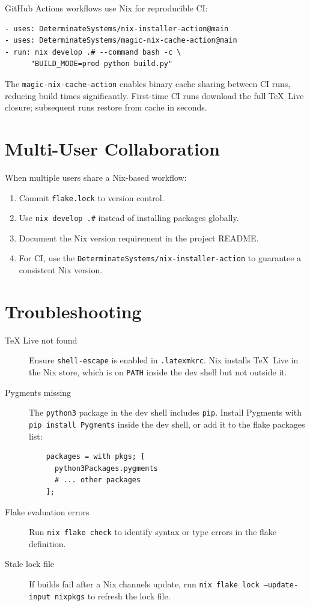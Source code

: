 GitHub Actions workflows use Nix for reproducible CI:

\begin{verbatim}
- uses: DeterminateSystems/nix-installer-action@main
- uses: DeterminateSystems/magic-nix-cache-action@main
- run: nix develop .# --command bash -c \
      "BUILD_MODE=prod python build.py"
\end{verbatim}

The \texttt{magic-nix-cache-action} enables binary cache sharing between CI
runs, reducing build times significantly.  First-time CI runs download
the full TeX~Live closure; subsequent runs restore from cache in seconds.

\section{Multi-User Collaboration}

When multiple users share a Nix-based workflow:

\begin{enumerate}
  \item Commit \texttt{flake.lock} to version control.
  \item Use \texttt{nix develop .#} instead of installing packages
        globally.
  \item Document the Nix version requirement in the project README.
  \item For CI, use the \texttt{DeterminateSystems/nix-installer-action}
        to guarantee a consistent Nix version.
\end{enumerate}

\section{Troubleshooting}

\begin{description}
  \item[TeX Live not found] Ensure \texttt{shell-escape} is enabled in
    \texttt{.latexmkrc}.  Nix installs TeX~Live in the Nix store, which
    is on \texttt{PATH} inside the dev shell but not outside it.

  \item[Pygments missing] The \texttt{python3} package in the dev shell
    includes \texttt{pip}.  Install Pygments with
    \texttt{pip install Pygments} inside the dev shell, or add it to the
    flake packages list:

    \begin{verbatim}
    packages = with pkgs; [
      python3Packages.pygments
      # ... other packages
    ];
    \end{verbatim}

  \item[Flake evaluation errors] Run \texttt{nix flake check} to
    identify syntax or type errors in the flake definition.

  \item[Stale lock file] If builds fail after a Nix channels update, run
    \texttt{nix flake lock --update-input nixpkgs} to refresh the lock
    file.
\end{description}
